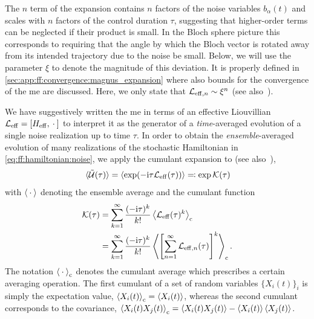 The $n$ term of the expansion contains $n$ factors of the noise variables $b_\alpha(t)$ and scales with $n$ factors of the control duration $\tau$, suggesting that higher-order terms can be neglected if their product is small.
In the Bloch sphere picture this corresponds to requiring that the angle by which the Bloch vector is rotated away from its intended trajectory due to the noise be small.
Below, we will use the parameter $\xi$ to denote the magnitude of this deviation.
It is properly defined in \cref{sec:app:ff:convergence:magnus_expansion} where also bounds for the convergence of the \gls{me} are discussed.
Here, we only state that $\mathcal{L}_{\mathrm{eff},n}\sim\xi^n$ (see also~).

We have suggestively written the \gls{me} in terms of an effective Liouvillian $\Li_\mr{eff} = \comm{H_\mr{eff}}{\placeholder}$ to interpret it as the generator of a \emph{time}-averaged evolution of a single noise realization up to time $\tau$.
In order to obtain the \emph{ensemble}-averaged evolution of many realizations of the stochastic Hamiltonian in \cref{eq:ff:hamiltonian:noise}, we apply the cumulant expansion to \liouvUe (see also~),
\begin{equation}\label{eq:ff:cumulant_expansion}
    \ev*{\liouvUe(\tau)} = \ev{\exp(-\i\tau\Li_\mr{eff}(\tau))} \eqqcolon \exp\cumulantfun(\tau)
\end{equation}
with $\ev{\placeholder}$ denoting the ensemble average  and the cumulant function~\cite{Kubo1962}
\begin{align}
    \cumulantfun(\tau) &= \sum_{k=1}^\infty\frac{(-\i\tau)^k}{k!}\ev{\Li_\mr{eff}(\tau)^k}_\mr{c} \\
                       &= \sum_{k=1}^\infty\frac{(-\i\tau)^k}{k!}\ev{\left[\sum_{n=1}^\infty \Li_{\mr{eff},n}(\tau)\right]^k}_\mr{c}. \label{eq:ff:cumulant}
\end{align}
The notation $\ev{\placeholder}_\mr{c}$ denotes the cumulant average which prescribes a certain averaging operation.
The first cumulant of a set of random variables $\{X_i(t)\}_i$ is simply the expectation value, $\ev{X_i(t)}_\mr{c} = \ev{X_i(t)}$, whereas the second cumulant corresponds to the covariance, $\ev{X_i(t)X_j(t)}_\mr{c} = \ev{X_i(t)X_j(t)} - \ev{X_i(t)}\ev{X_j(t)}$.
